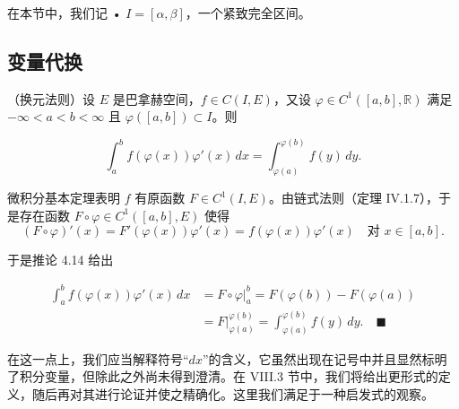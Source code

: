 在本节中，我们记
• $ I = [\alpha, \beta] $，一个紧致完全区间。

\subsection*{变量代换}

\begin{theorem}

（换元法则）设 $ E $ 是巴拿赫空间，$ f \in C(I, E) $，又设 $ \varphi \in C^1([a, b], \mathbb{R}) $ 满足 $ -\infty < a < b < \infty $ 且 $ \varphi([a, b]) \subset I $。则

\[
\int_{a}^{b} f(\varphi(x)) \varphi'(x) \, dx = \int_{\varphi(a)}^{\varphi(b)} f(y) \, dy .
\]

\proofhead
微积分基本定理表明 $ f $ 有原函数 $ F \in C^1(I, E) $。由链式法则（定理 IV.1.7），于是存在函数 $ F \circ \varphi \in C^1([a, b], E) $ 使得
\[
(F \circ \varphi)'(x) = F'(\varphi(x)) \varphi'(x) = f(\varphi(x)) \varphi'(x) \quad \text{对 } x \in [a, b] .
\]

于是推论 4.14 给出

\begin{equation*}
\begin{aligned}
\int_{a}^{b} f(\varphi(x)) \varphi'(x) \, dx &= F \circ \varphi \big|_{a}^{b} = F(\varphi(b)) - F(\varphi(a)) \\ &= F \big|_{\varphi(a)}^{\varphi(b)} = \int_{\varphi(a)}^{\varphi(b)} f(y) \, dy .
\quad\blacksquare
\end{aligned}
\end{equation*}
\end{theorem}

在这一点上，我们应当解释符号“$ dx $”的含义，它虽然出现在记号中并且显然标明了积分变量，但除此之外尚未得到澄清。在 VIII.3 节中，我们将给出更形式的定义，随后再对其进行论证并使之精确化。这里我们满足于一种启发式的观察。

